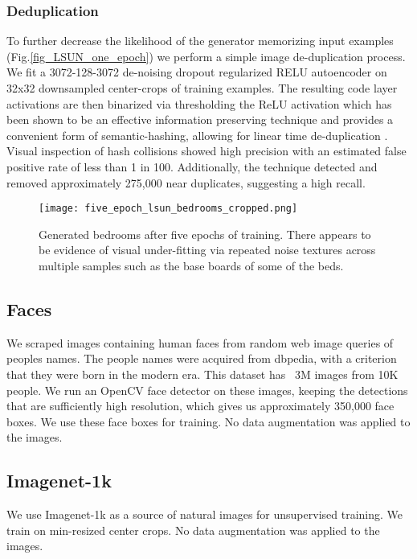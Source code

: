 \documentclass{article} \usepackage{iclr2016_conference,times}
\begin{document}
\subsubsection{Deduplication}
To further decrease the likelihood of the generator memorizing input examples (Fig.\ref{fig_LSUN_one_epoch}) we perform a simple image de-duplication process. We fit a 3072-128-3072 de-noising dropout regularized RELU autoencoder on 32x32 downsampled center-crops of training examples. The resulting code layer activations are then binarized via thresholding the ReLU activation which has been shown to be an effective information preserving technique \citep{srivastava2014understanding} and provides a convenient form of semantic-hashing, allowing for linear time de-duplication . Visual inspection of hash collisions showed high precision with an estimated false positive rate of less than 1 in 100. Additionally, the technique detected and removed approximately 275,000 near duplicates, suggesting a high recall.

\begin{figure}[h]
\begin{center}
\texttt{[image: five\_epoch\_lsun\_bedrooms\_cropped.png]}
\end{center}
\caption{\label{fig_LSUN_five_epoch} Generated bedrooms after five epochs of training. There appears to be evidence of visual under-fitting via repeated noise textures across multiple samples such as the base boards of some of the beds.}
\end{figure}

\subsection{Faces}
We scraped images containing human faces from random web image queries of peoples names. The people names were acquired from dbpedia, with a criterion that they were born in the modern era. This dataset has ~3M images from 10K people. We run an OpenCV face detector on these images, keeping the detections that are sufficiently high resolution, which gives us approximately 350,000 face boxes. We use these face boxes for training. No data augmentation was applied to the images.

\subsection{Imagenet-1k}
We use Imagenet-1k \citep{deng2009imagenet} as a source of natural images for unsupervised training. We train on  min-resized center crops. No data augmentation was applied to the images.
\end{document}
